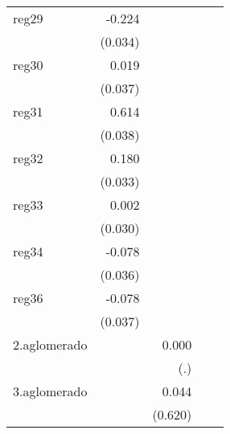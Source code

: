 {\begin{longtable}{l*{4}{D{.}{.}{-1}}}
\addlinespace
reg29       &      -0.224\sym{***}&                     &                     &                     \\
            &     (0.034)         &                     &                     &                     \\
\addlinespace
reg30       &       0.019         &                     &                     &                     \\
            &     (0.037)         &                     &                     &                     \\
\addlinespace
reg31       &       0.614\sym{***}&                     &                     &                     \\
            &     (0.038)         &                     &                     &                     \\
\addlinespace
reg32       &       0.180\sym{***}&                     &                     &                     \\
            &     (0.033)         &                     &                     &                     \\
\addlinespace
reg33       &       0.002         &                     &                     &                     \\
            &     (0.030)         &                     &                     &                     \\
\addlinespace
reg34       &      -0.078\sym{*}  &                     &                     &                     \\
            &     (0.036)         &                     &                     &                     \\
\addlinespace
reg36       &      -0.078\sym{*}  &                     &                     &                     \\
            &     (0.037)         &                     &                     &                     \\
\addlinespace
2.aglomerado&                     &       0.000         &                     &                     \\
            &                     &         (.)         &                     &                     \\
\addlinespace
3.aglomerado&                     &       0.044         &                     &                     \\
            &                     &     (0.620)         &                     &                     \\

\end{longtable}}
